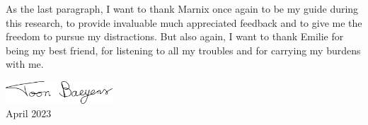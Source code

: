 As the last paragraph, I want to thank Marnix once again to be my guide during this research, to provide invaluable much appreciated feedback and to give me the freedom to pursue my distractions. But also again, I want to thank Emilie for being my best friend, for listening to all my troubles and for carrying my burdens with me.

\vspace{1cm}

\begin{flushright}
    \includegraphics[width=4cm]{img/signature.pdf}\\
    April 2023
\end{flushright}




\stopchapter
